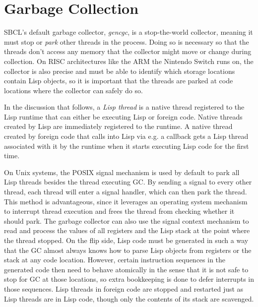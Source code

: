 \documentclass[format=sigconf]{acmart}
\begin{document}
\section{Garbage Collection}\label{gc}
SBCL's default garbage collector, \textit{gencgc}, is a stop-the-world collector, meaning it must stop or \textit{park} other threads in the process. Doing so is necessary so that the threads don't access any memory that the collector might move or change during collection. On RISC architectures like the ARM the Nintendo Switch runs on, the collector is also precise and must be able to identify which storage locations contain Lisp objects, so it is important that the threads are parked at code locations where the collector can safely do so.

In the discussion that follows, a \textit{Lisp thread} is a native thread registered to the Lisp runtime that can either be executing Lisp or foreign code. Native threads created by Lisp are immediately registered to the runtime. A native thread created by foreign code that calls into Lisp via e.g. a callback gets a Lisp thread associated with it by the runtime when it starts executing Lisp code for the first time.

On Unix systems, the POSIX signal mechanism is used by default to park all Lisp threads besides the thread executing GC. By sending a signal to every other thread, each thread will enter a signal handler, which can then park the thread. This method is advantageous, since it leverages an operating system mechanism to interrupt thread execution and frees the thread from checking whether it should park. The garbage collector can also use the signal context mechanism to read and process the values of all registers and the Lisp stack at the point where the thread stopped. On the flip side, Lisp code must be generated in such a way that the GC almost always knows how to parse Lisp objects from registers or the stack at any code location. However, certain instruction sequences in the generated code then need to behave atomically in the sense that it is not safe to stop for GC at those locations, so extra bookkeeping is done to defer interrupts in those sequences. Lisp threads in foreign code are stopped and restarted just as Lisp threads are in Lisp code, though only the contents of its stack are scavenged.
\end{document}
